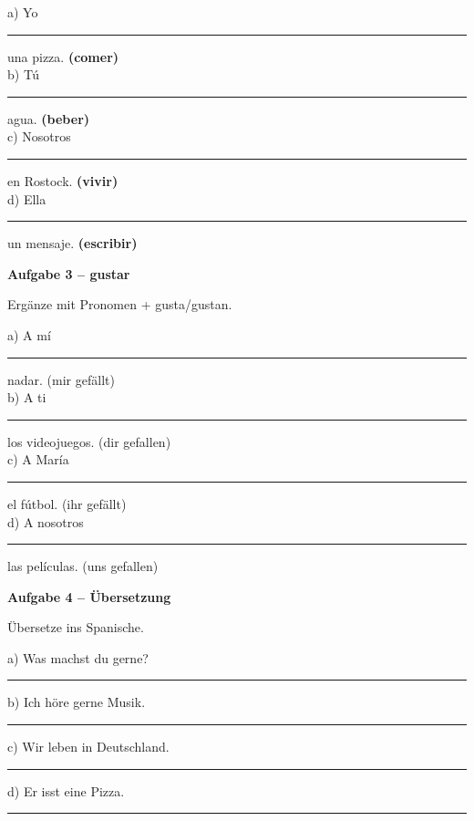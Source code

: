 \documentclass[11pt, a4paper]{article}
\newcommand{\fachfarbe}{spanisch}
\newcommand{\punktebox}[1]{\hfill\fbox{\small \_/#1}}
\newcommand{\luecke}[1]{\rule{#1}{0.4pt}}
\newenvironment{aufgabe}[1]{%
    \needspace{5\baselineskip}%
    \nopagebreak[4]%
    \vspace{10pt}
    \noindent\textbf{\textcolor{\fachfarbe}{Aufgabe #1}}
    \nopagebreak[4]%
    \vspace{5pt}
    \nopagebreak[4]%
    \begin{list}{}{\leftmargin=0pt}
    \item[]
}{%
    \end{list}
}
\newcommand{\er}[1]{\textcolor{erfarbe}{\textbf{#1}}}
\newcommand{\ir}[1]{\textcolor{irfarbe}{\textbf{#1}}}
\begin{document}
\noindent
a) Yo \luecke{3cm} una pizza. \er{(comer)}\\[1em]
b) Tú \luecke{3cm} agua. \er{(beber)}\\[1em]
c) Nosotros \luecke{3cm} en Rostock. \ir{(vivir)}\\[1em]
d) Ella \luecke{3cm} un mensaje. \ir{(escribir)}

\vspace{15pt}


\begin{aufgabe}{3 -- gustar}
Ergänze mit Pronomen + gusta/gustan. \punktebox{8}
\end{aufgabe}

\noindent
a) A mí \luecke{4cm} nadar. (mir gefällt)\\[1em]
b) A ti \luecke{4cm} los videojuegos. (dir gefallen)\\[1em]
c) A María \luecke{4cm} el fútbol. (ihr gefällt)\\[1em]
d) A nosotros \luecke{4cm} las películas. (uns gefallen)

\vspace{15pt}


\begin{aufgabe}{4 -- Übersetzung}
Übersetze ins Spanische. \punktebox{8}
\end{aufgabe}

\noindent
a) Was machst du gerne?

\luecke{10cm}

\vspace{1em}

\noindent
b) Ich höre gerne Musik.

\luecke{10cm}

\vspace{1em}

\noindent
c) Wir leben in Deutschland.

\luecke{10cm}

\vspace{1em}

\noindent
d) Er isst eine Pizza.

\luecke{10cm}

\end{document}
